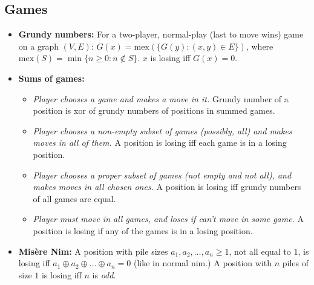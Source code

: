 \subsection{Games}

\begin{small}
\begin{itemize}
    \item \textbf{Grundy numbers:} For a two-player, normal-play (last to move wins) game on a graph $(V,E)$:
    $G(x) = \mbox{mex}(\{ G(y) : (x, y) \in E \})$,
    where $\mbox{mex}(S) = \min \{ n \ge 0: n \notin S \}$.
    $x$ is losing iff $G(x) = 0$.

    \item \textbf{Sums of games:}
    \begin{itemize}
        \item \emph{Player chooses a game and makes a move in it.} Grundy number of a position is xor of grundy numbers of positions in summed games.
        \item \emph{Player chooses a non-empty subset of games (possibly, all) and makes moves in all of them.} A position is losing iff each game is in a losing position.
        \item \emph{Player chooses a proper subset of games (not empty and not all), and makes moves in all chosen ones.} A position is losing iff grundy numbers of all games are equal.
        \item \emph{Player must move in all games, and loses if can't move in some game.} A position is losing if any of the games is in a losing position.
    \end{itemize}

    \item \textbf{Mis\`{e}re Nim:} A position with pile sizes $a_1, a_2, \dots, a_n \ge 1$, not all equal to $1$, is losing iff $a_1 \oplus a_2 \oplus \dots \oplus a_n = 0$ (like in normal nim.) A position with $n$ piles of size $1$ is losing iff $n$ is \emph{odd}.
\end{itemize}
\end{small}